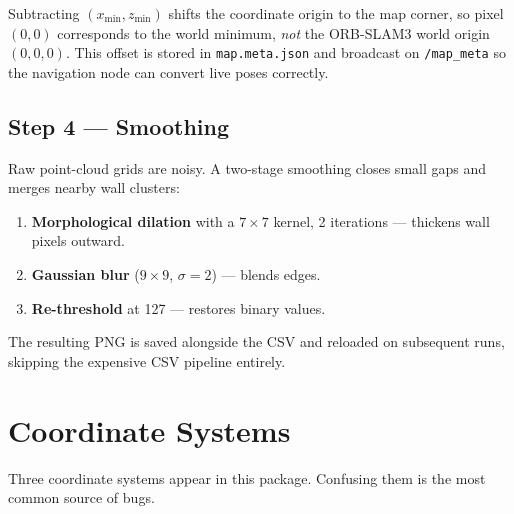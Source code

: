 \documentclass[12pt,a4paper]{article}
\begin{document}
\begin{tcolorbox}[notebox]
  Subtracting $(x_{\min}, z_{\min})$ shifts the coordinate origin to the
  map corner, so pixel $(0,0)$ corresponds to the world minimum, \emph{not}
  the ORB-SLAM3 world origin $(0,0,0)$. This offset is stored in
  \texttt{map.meta.json} and broadcast on \texttt{/map\_meta} so the
  navigation node can convert live poses correctly.
\end{tcolorbox}

\subsection{Step 4 --- Smoothing}

Raw point-cloud grids are noisy. A two-stage smoothing closes small gaps and
merges nearby wall clusters:

\begin{enumerate}
  \item \textbf{Morphological dilation} with a $7{\times}7$ kernel,
        2 iterations --- thickens wall pixels outward.
  \item \textbf{Gaussian blur} ($9{\times}9$, $\sigma=2$) --- blends edges.
  \item \textbf{Re-threshold} at 127 --- restores binary values.
\end{enumerate}

The resulting PNG is saved alongside the CSV and reloaded on subsequent runs,
skipping the expensive CSV pipeline entirely.

\section{Coordinate Systems}

Three coordinate systems appear in this package. Confusing them is the most
common source of bugs.
\end{document}
